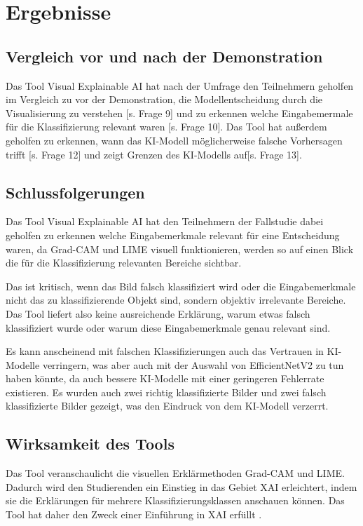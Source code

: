 \section{Ergebnisse}
\subsection{Vergleich vor und nach der Demonstration}
Das Tool Visual Explainable AI hat nach der Umfrage den Teilnehmern geholfen im Vergleich zu vor der Demonstration, die Modellentscheidung durch die Visualisierung zu verstehen [s. Frage 9] und zu erkennen welche Eingabemermale für die Klassifizierung relevant waren [s. Frage 10].
Das Tool hat außerdem geholfen zu erkennen, wann das KI-Modell möglicherweise falsche Vorhersagen trifft [s. Frage 12] und zeigt Grenzen des KI-Modells auf[s. Frage 13].
\subsection{Schlussfolgerungen}

Das Tool Visual Explainable AI hat den Teilnehmern der Fallstudie dabei geholfen zu erkennen welche Eingabemerkmale relevant für eine Entscheidung waren, da Grad-CAM und LIME visuell funktionieren, werden so auf einen Blick die für die Klassifizierung relevanten Bereiche sichtbar.

Das ist kritisch, wenn das Bild falsch klassifiziert wird oder die Eingabemerkmale nicht das zu klassifizierende Objekt sind, sondern objektiv irrelevante Bereiche.
Das Tool liefert also keine ausreichende Erklärung, warum etwas falsch klassifiziert wurde oder warum diese Eingabemerkmale genau relevant sind. 

Es kann anscheinend mit falschen Klassifizierungen auch das Vertrauen in KI-Modelle verringern, was aber auch mit der Auswahl von EfficientNetV2 zu tun haben könnte, da auch bessere KI-Modelle mit einer geringeren Fehlerrate existieren. Es wurden auch zwei richtig klassifizierte Bilder und zwei falsch klassifizierte Bilder gezeigt, was den Eindruck von dem KI-Modell verzerrt. 

\subsection{Wirksamkeit des Tools}
Das Tool veranschaulicht die visuellen Erklärmethoden Grad-CAM und LIME. Dadurch wird den Studierenden ein Einstieg in das Gebiet XAI erleichtert, indem sie die Erklärungen für mehrere Klassifizierungsklassen anschauen können. Das Tool hat daher den Zweck einer Einführung in XAI erfüllt .

